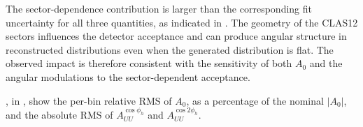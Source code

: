 The sector-dependence contribution is larger than the corresponding fit uncertainty for all three quantities, as indicated in . The geometry of the CLAS12 sectors influences the detector acceptance and can produce angular structure in reconstructed distributions even when the generated distribution is flat. The observed impact is therefore consistent with the sensitivity of both $A_{0}$ and the angular modulations to the sector-dependent acceptance.

, in , show the per-bin relative RMS of $A_{0}$, as a percentage of the nominal $|A_{0}|$, and the absolute RMS of $A_{UU}^{\cos\phi_h}$ and $A_{UU}^{\cos 2\phi_h}$.

